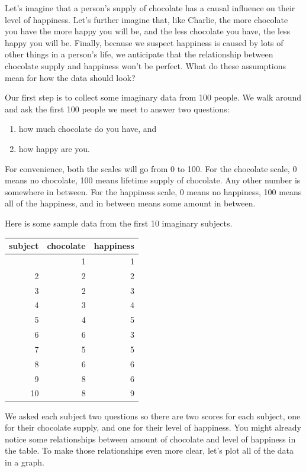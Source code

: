 \documentclass[
  letterpaper,
  DIV=11,
  numbers=noendperiod]{scrreprt}
\providecommand{\tightlist}{%
  \setlength{\itemsep}{0pt}\setlength{\parskip}{0pt}}\usepackage{longtable,booktabs,array}
\begin{document}
Let's imagine that a person's supply of chocolate has a causal influence
on their level of happiness. Let's further imagine that, like Charlie,
the more chocolate you have the more happy you will be, and the less
chocolate you have, the less happy you will be. Finally, because we
suspect happiness is caused by lots of other things in a person's life,
we anticipate that the relationship between chocolate supply and
happiness won't be perfect. What do these assumptions mean for how the
data should look?

Our first step is to collect some imaginary data from 100 people. We
walk around and ask the first 100 people we meet to answer two
questions:

\begin{enumerate}
\def\labelenumi{\arabic{enumi}.}
\tightlist
\item
  how much chocolate do you have, and
\item
  how happy are you.
\end{enumerate}

For convenience, both the scales will go from 0 to 100. For the
chocolate scale, 0 means no chocolate, 100 means lifetime supply of
chocolate. Any other number is somewhere in between. For the happiness
scale, 0 means no happiness, 100 means all of the happiness, and in
between means some amount in between.

Here is some sample data from the first 10 imaginary subjects.

\begin{longtable}[]{@{}rrr@{}}
\toprule\noalign{}
subject & chocolate & happiness \\
\midrule\noalign{}
\endhead
\bottomrule\noalign{}
\endlastfoot
1 & 1 & 1 \\
2 & 2 & 2 \\
3 & 2 & 3 \\
4 & 3 & 4 \\
5 & 4 & 5 \\
6 & 6 & 3 \\
7 & 5 & 5 \\
8 & 6 & 6 \\
9 & 8 & 6 \\
10 & 8 & 9 \\
\end{longtable}

We asked each subject two questions so there are two scores for each
subject, one for their chocolate supply, and one for their level of
happiness. You might already notice some relationships between amount of
chocolate and level of happiness in the table. To make those
relationships even more clear, let's plot all of the data in a graph.
\end{document}
